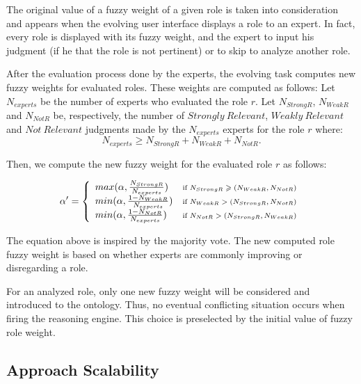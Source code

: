 		The original value of a fuzzy weight of a given role is taken into
		consideration and appears when the evolving user interface displays a role to 
		an expert. In fact, every role is displayed 
		with its fuzzy weight, and the expert  to input his judgment (if he
		 that the role is not pertinent) or to skip to analyze another role.
		
		After the evaluation process done by the experts, the  evolving task computes new fuzzy 
		weights for evaluated roles. These weights are computed as follows:
		Let $N_{experts}$ be the number of experts who evaluated the role $r$. Let $N_{StrongR}$, 
		$N_{WeakR}$ and $N_{NotR}$ be, respectively, the number of $Strongly~Relevant$, $Weakly~Relevant$ 
		and $Not~Relevant$ judgments made by the $N_{experts}$ experts for the role $r$ where:
		\begin{equation}
			N_{experts} \geqslant  N_{StrongR} +  N_{WeakR} +  N_{NotR}.
		\end{equation}

		Then, we compute the new fuzzy weight for the evaluated role $r$ as follows:
		
		\begin{equation}
		\alpha'=\left\{
			\begin{array}{l c}
				max(\alpha, \frac{N_{StrongR}}{N_{experts}})	& 
					\text{\scriptsize{if $N_{StrongR} \geqslant (N_{WeakR},N_{NotR})$}} \\
				min(\alpha, \frac{1-N_{WeakR}}{N_{experts}}) & 
					\text{\scriptsize{if $N_{WeakR} > (N_{StrongR},N_{NotR})$}}\\
				min(\alpha, \frac{1-N_{NotR}}{N_{experts}})  &
					\text{\scriptsize{if $N_{NotR} > (N_{StrongR},N_{WeakR})$}}
			\end{array}
		  \right.
		\end{equation}

		The equation above is inspired by the majority vote. The new computed role 
		fuzzy weight is based on whether experts are commonly improving or disregarding a role.
		
		For an analyzed role, only one new fuzzy weight will be considered
		and introduced to the ontology. Thus, no eventual conflicting situation 
		occurs when firing the reasoning engine.
		This choice is preselected by the initial value of fuzzy role weight.

		\subsection{Approach Scalability}

